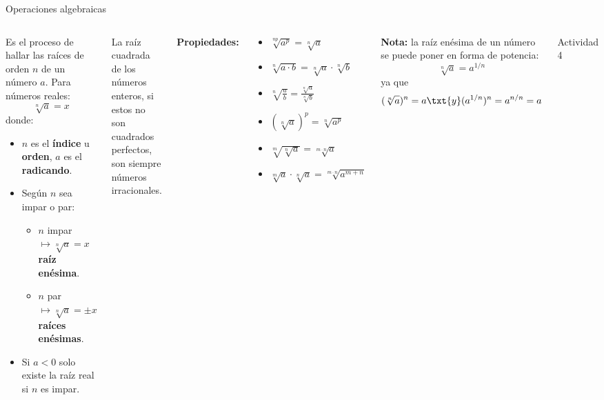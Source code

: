 \documentclass[9pt, aspectratio=169]{beamer}
\begin{document}
\begin{frame}{Operaciones algebraicas}
\begin{columns}[c]
\cx 
\begin{definition}[Radicación]
Es el proceso de hallar las raíces de orden $n$ de un número $a$. Para números reales:
\[ \sqrt[n]{a} = x \]
donde:
\begin{itemize}
    \item $n$ es el \textbf{índice} u \textbf{orden}, $a$ es el \textbf{radicando}.
    \item Según $n$ sea impar o par:
        \begin{itemize}
            \item $n$ impar $\mapsto \sqrt[n]{a} = x$ \textbf{raíz enésima}.
            \item $n$ par $\mapsto \sqrt[n]{a} = \pm x$ \textbf{raíces enésimas}.
        \end{itemize}
    \item Si $a < 0$ solo existe la raíz real si $n$ es impar.
\end{itemize}
\end{definition}
\pause
\begin{alertblock}{\centering \faExclamationTriangle}
    La raíz cuadrada de los números enteros, si estos no son cuadrados perfectos, son siempre números irracionales.
\end{alertblock}
\pause
\cx 
\textbf{Propiedades:}
\begin{multicols}{2}
    \begin{itemize}
    \item $ \sqrt[np]{a^p} = \sqrt[n]{a} $
    \item $ \sqrt[n]{a \cdot b} = \sqrt[n]{a} \cdot \sqrt[n]{b} $
    \item $\sqrt[n]{\frac{a}{b}} = \frac{\sqrt[n]{a}}{\sqrt[n]{b}}$
    \item $\left(\sqrt[n]{a}\right)^p = \sqrt[n]{a^p}$
    \item $\sqrt[m]{\sqrt[n]{a}} = \sqrt[m \cdot n]{a}$
    \item $\sqrt[m]{a} \cdot \sqrt[n]{a} = \sqrt[m \cdot n]{a^{m + n}}$
\end{itemize}
\end{multicols}
\textbf{Nota:} la raíz enésima de un número se puede poner en forma de potencia:
\[ \sqrt[n]{a} = a^{1/n} \] 
ya que
\[ (\sqrt[n]{a})^n = a \txt{y} (a^{1/n})^n = a^{n/n} = a \]

\vfill
\begin{center}
    {\Large \alert{\faArrowCircleRight \faPen* Actividad 4}}
\end{center}
\end{columns}
\end{frame}
\end{document}
